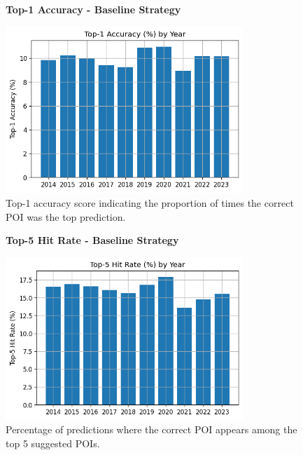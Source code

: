 \documentclass[12pt,a4paper]{article}
\begin{document}
\begin{enumerate}
\begin{figure}[H]
\centering
\textbf{Top-1 Accuracy - Baseline Strategy}\par
\vspace{0.5em}
\includegraphics[width=0.8\textwidth]{../img/no_SPACE-GEO_n-1_come_current_POI/top1_accuracy.png}
\caption{Top-1 accuracy score indicating the proportion of times the correct POI was the top prediction.}
\label{fig:baseline_top1}
\end{figure}

\begin{figure}[H]
\centering
\textbf{Top-5 Hit Rate - Baseline Strategy}\par
\vspace{0.5em}
\includegraphics[width=0.8\textwidth]{../img/no_SPACE-GEO_n-1_come_current_POI/top5_hit_rate.png}
\caption{Percentage of predictions where the correct POI appears among the top 5 suggested POIs.}
\label{fig:baseline_top5}
\end{figure}


\end{enumerate}
\end{document}
